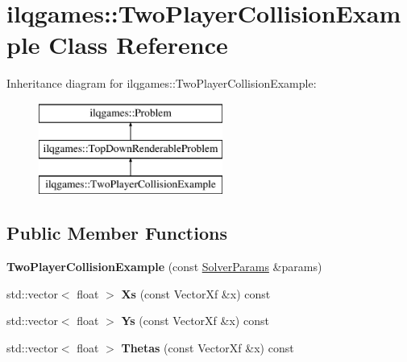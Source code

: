 \hypertarget{classilqgames_1_1_two_player_collision_example}{}\section{ilqgames\+:\+:Two\+Player\+Collision\+Example Class Reference}
\label{classilqgames_1_1_two_player_collision_example}
Inheritance diagram for ilqgames\+:\+:Two\+Player\+Collision\+Example\+:\begin{figure}[H]
\begin{center}
\leavevmode
\includegraphics[height=3.000000cm]{classilqgames_1_1_two_player_collision_example}
\end{center}
\end{figure}
\subsection*{Public Member Functions}
\begin{DoxyCompactItemize}
\item 
{\bfseries Two\+Player\+Collision\+Example} (const \hyperlink{structilqgames_1_1_solver_params}{Solver\+Params} \&params)\hypertarget{classilqgames_1_1_two_player_collision_example_a3e024db1fff94cce6ef3dd74cd0134b3}{}\label{classilqgames_1_1_two_player_collision_example_a3e024db1fff94cce6ef3dd74cd0134b3}

\item 
std\+::vector$<$ float $>$ {\bfseries Xs} (const Vector\+Xf \&x) const \hypertarget{classilqgames_1_1_two_player_collision_example_a5d28c826a167a43194f73d050ebd80a2}{}\label{classilqgames_1_1_two_player_collision_example_a5d28c826a167a43194f73d050ebd80a2}

\item 
std\+::vector$<$ float $>$ {\bfseries Ys} (const Vector\+Xf \&x) const \hypertarget{classilqgames_1_1_two_player_collision_example_adb5a496942055db312aa02bc037a2f3d}{}\label{classilqgames_1_1_two_player_collision_example_adb5a496942055db312aa02bc037a2f3d}

\item 
std\+::vector$<$ float $>$ {\bfseries Thetas} (const Vector\+Xf \&x) const \hypertarget{classilqgames_1_1_two_player_collision_example_a04a5ef982afe9984fa1fe46278fff8b4}{}\label{classilqgames_1_1_two_player_collision_example_a04a5ef982afe9984fa1fe46278fff8b4}

\end{DoxyCompactItemize}
